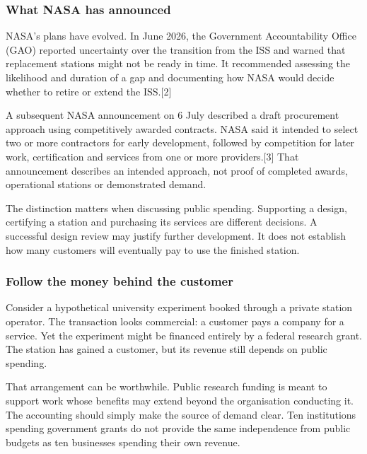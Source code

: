 \documentclass[11pt,letterpaper]{article}
\begin{document}
\hypertarget{what-nasa-has-announced}{%
\subsubsection{What NASA has announced}\label{what-nasa-has-announced}}

NASA's plans have evolved. In June 2026, the Government Accountability
Office (GAO) reported uncertainty over the transition from the ISS and
warned that replacement stations might not be ready in time. It
recommended assessing the likelihood and duration of a gap and
documenting how NASA would decide whether to retire or extend the
ISS.{[}2{]}

A subsequent NASA announcement on 6 July described a draft procurement
approach using competitively awarded contracts. NASA said it intended to
select two or more contractors for early development, followed by
competition for later work, certification and services from one or more
providers.{[}3{]} That announcement describes an intended approach, not
proof of completed awards, operational stations or demonstrated demand.

The distinction matters when discussing public spending. Supporting a
design, certifying a station and purchasing its services are different
decisions. A successful design review may justify further development.
It does not establish how many customers will eventually pay to use the
finished station.

\hypertarget{follow-the-money-behind-the-customer}{%
\subsubsection{Follow the money behind the
customer}\label{follow-the-money-behind-the-customer}}

Consider a hypothetical university experiment booked through a private
station operator. The transaction looks commercial: a customer pays a
company for a service. Yet the experiment might be financed entirely by
a federal research grant. The station has gained a customer, but its
revenue still depends on public spending.

That arrangement can be worthwhile. Public research funding is meant to
support work whose benefits may extend beyond the organisation
conducting it. The accounting should simply make the source of demand
clear. Ten institutions spending government grants do not provide the
same independence from public budgets as ten businesses spending their
own revenue.
\end{document}
